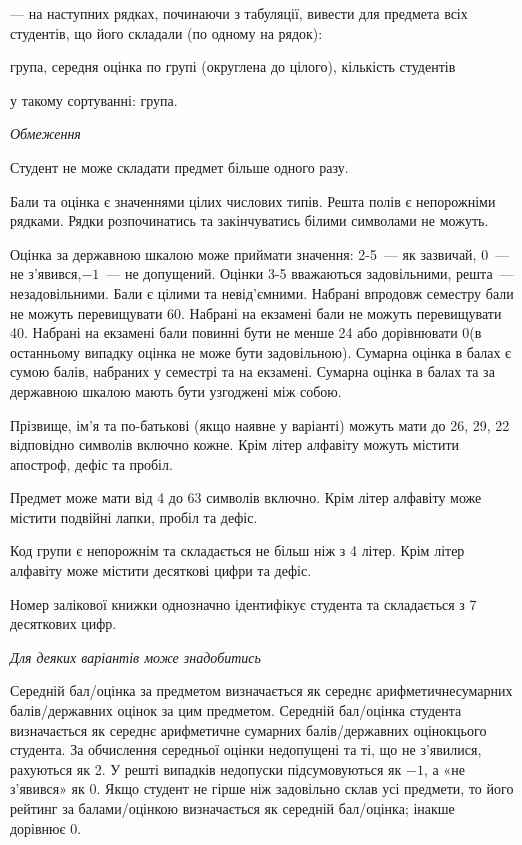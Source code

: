\documentclass[11pt, ukrainian]{article}
\begin{document}
{\noindent}--- на наступних рядках, починаючи з табуляції, вивести для предмета всіх студентів, що його складали (по одному на рядок):\par
група, середня оцінка по групі (округлена до цілого), кількість студентів

{\noindent}у такому сортуванні: група.


\bigskip\textit{Обмеження}

Студент не може складати предмет більше одного разу.

Бали та оцінка є значеннями цілих числових типів. Решта полів є непорожніми рядками.
Рядки розпочинатись та закінчуватись білими символами не можуть.

Оцінка за державною шкалою може приймати значення: 2-5~--- як зазвичай, 0~--- не з’явився,$-1$~--- не допущений. 
Оцінки 3-5 вважаються задовільними, решта~--- незадовільними. 
Бали є цілими та невід’ємними.
Набрані впродовж семестру бали не можуть перевищувати 60. 
Набрані на екзамені бали не можуть перевищувати 40. 
Набрані на екзамені бали повинні бути не менше 24 або дорівнювати 0(в останньому випадку оцінка не може бути задовільною). 
Сумарна оцінка в балах є сумою балів, набраних у семестрі та на екзамені.
Сумарна оцінка в балах та за державною шкалою мають бути узгоджені між собою.

Прізвище, ім’я та по-батькові (якщо наявне у варіанті) можуть мати до 26, 29, 22 відповідно символів включно кожне. 
Крім літер алфавіту можуть містити апостроф, дефіс та пробіл.

Предмет може мати від 4 до 63 символів включно. 
Крім літер алфавіту може містити подвійні лапки, пробіл та дефіс.

Код групи є непорожнім та складається не більш ніж з 4 літер. 
Крім літер алфавіту може містити десяткові цифри та дефіс.


Номер залікової книжки однозначно ідентифікує студента та складається з 7 десяткових цифр. 

\bigskip\textit{Для деяких варіантів може знадобитись}

Середній бал/оцінка за предметом визначається як середнє арифметичнесумарних балів/державних оцінок за цим предметом. 
Середній бал/оцінка студента визначається як середнє арифметичне сумарних балів/державних оцінокцього студента. 
За обчислення середньої оцінки недопущені та ті, що не з’явилися, рахуються як 2.
У решті випадків недопуски підсумовуються як $-1$, а «не з’явився» як 0.
Якщо студент не гірше ніж задовільно склав усі предмети, 
то його рейтинг за балами/оцінкою визначається як середній бал/оцінка; інакше дорівнює 0.
\end{document}
